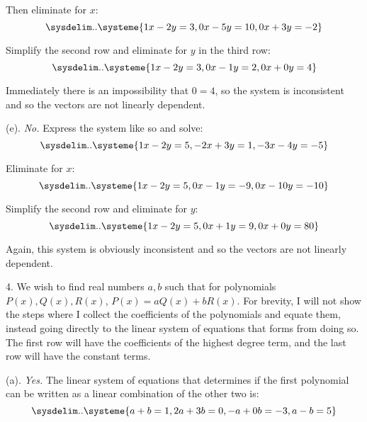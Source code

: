 \documentclass[11pt]{article}
\begin{document}
Then eliminate for $x$:
\begin{equation*}
    \sysdelim..\systeme{
        1x -2y = 3,
        0x -5y = 10,
        0x +3y = -2
    }
\end{equation*}

Simplify the second row and eliminate for $y$ in the third row:
\begin{equation*}
    \sysdelim..\systeme{
        1x -2y = 3,
        0x -1y = 2,
        0x +0y = 4
    }
\end{equation*}

Immediately there is an impossibility that $0=4$, so the system is inconsistent and so the vectors are not linearly dependent.

(e). \textit{No.} Express the system like so and solve:
\begin{equation*}
    \sysdelim..\systeme{
        1x  -2y = 5,
        -2x  +3y = 1,
        -3x  -4y = -5
    }
\end{equation*}

Eliminate for $x$:
\begin{equation*}
    \sysdelim..\systeme{
        1x  -2y = 5,
        0x  -1y = -9,
        0x  -10y = -10
    }
\end{equation*}

Simplify the second row and eliminate for $y$:
\begin{equation*}
    \sysdelim..\systeme{
        1x  -2y = 5,
        0x + 1y = 9,
        0x + 0y = 80
    }
\end{equation*}

Again, this system is obviously inconsistent and so the vectors are not linearly dependent.

4. We wish to find real numbers $a,b$ such that for polynomials $P(x),Q(x),R(x)$, $P(x) = aQ(x)+bR(x)$. For brevity, I will not show the steps where I collect the coefficients of the polynomials and equate them, instead going directly to the linear system of equations that forms from doing so. The first row will have the coefficients of the highest degree term, and the last row will have the constant terms.

(a). \textit{Yes.} The linear system of equations that determines if the first polynomial can be written as a linear combination of the other two is:
\begin{equation*}
    \sysdelim..\systeme{
        a  +b =  1,
        2a  +3b =  0,
        -a  +0b =  -3,
        a  -b =  5
    }
\end{equation*}
\end{document}
